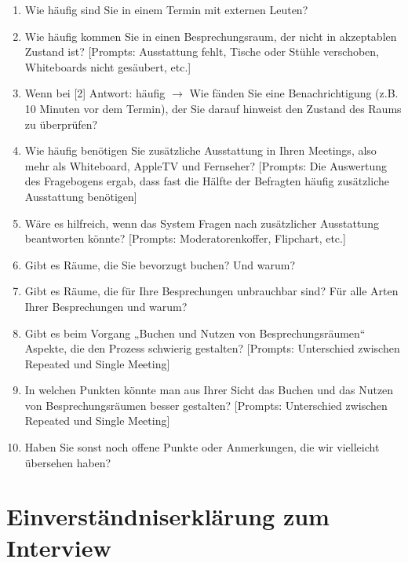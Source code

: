 \begin{enumerate}
        
    \item Wie häufig sind Sie in einem Termin mit externen Leuten?
    
    \item Wie häufig kommen Sie in einen Besprechungsraum, der nicht in akzeptablen Zustand ist? [Prompts: Ausstattung fehlt, Tische oder Stühle verschoben, Whiteboards nicht gesäubert, etc.]

    \item  Wenn bei [2] Antwort: häufig $\rightarrow$ Wie fänden Sie eine Benachrichtigung (z.B. 10 Minuten vor dem Termin), der Sie darauf hinweist den Zustand des Raums zu überprüfen?
    
    \item Wie häufig benötigen Sie zusätzliche Ausstattung in Ihren Meetings, also mehr als Whiteboard, AppleTV und Fernseher? [Prompts: Die Auswertung des Fragebogens ergab, dass fast die Hälfte der Befragten häufig zusätzliche Ausstattung benötigen]

    \item Wäre es hilfreich, wenn das System Fragen nach zusätzlicher Ausstattung beantworten könnte? [Prompts: Moderatorenkoffer, Flipchart, etc.]
        
    \item Gibt es Räume, die Sie bevorzugt buchen? Und warum?
    
    \item Gibt es Räume, die für Ihre Besprechungen unbrauchbar sind? Für alle Arten Ihrer Besprechungen und warum?
        
    \item Gibt es beim Vorgang „Buchen und Nutzen von Besprechungsräumen“ Aspekte, die den Prozess schwierig gestalten?  [Prompts: Unterschied zwischen Repeated und Single Meeting]

    \item In welchen Punkten könnte man aus Ihrer Sicht das Buchen und das Nutzen von Besprechungsräumen besser gestalten? [Prompts: Unterschied zwischen Repeated und Single Meeting]
        
    \item Haben Sie sonst noch offene Punkte oder Anmerkungen, die wir vielleicht übersehen haben?

\end{enumerate}
\clearpage
\section{Einverständniserklärung zum Interview}
\label{sec:anhang-einverstaendnis-interview}

